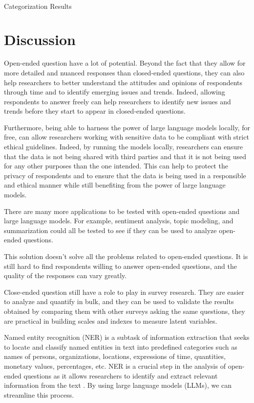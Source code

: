 \documentclass[
  authoryear,
  preprint,
  3p]{elsarticle}
\makeatletter
\let\oldparagraph\paragraph
\renewcommand{\paragraph}{
    \@ifstar
      \xxxParagraphStar
      \xxxParagraphNoStar
  }
\newcommand{\xxxParagraphStar}[1]{\oldparagraph*{#1}\mbox{}}
\newcommand{\xxxParagraphNoStar}[1]{\oldparagraph{#1}\mbox{}}
\makeatother
\begin{document}
\paragraph{Categorization Results}\label{categorization-results}

\section{Discussion}\label{discussion}

Open-ended question have a lot of potential. Beyond the fact that they
allow for more detailed and nuanced responses than closed-ended
questions, they can also help researchers to better understand the
attitudes and opinions of respondents through time and to identify
emerging issues and trends. Indeed, allowing respondents to answer
freely can help researchers to identify new issues and trends before
they start to appear in closed-ended questions.

Furthermore, being able to harness the power of large language models
locally, for free, can allow researchers working with sensitive data to
be compliant with strict ethical guidelines. Indeed, by running the
models locally, researchers can ensure that the data is not being shared
with third parties and that it is not being used for any other purposes
than the one intended. This can help to protect the privacy of
respondents and to ensure that the data is being used in a responsible
and ethical manner while still benefiting from the power of large
language models.

There are many more applications to be tested with open-ended questions
and large language models. For example, sentiment analysis, topic
modeling, and summarization could all be tested to see if they can be
used to analyze open-ended questions.

This solution doesn't solve all the problems related to open-ended
questions. It is still hard to find respondents willing to answer
open-ended questions, and the quality of the responses can vary greatly.

Close-ended question still have a role to play in survey research. They
are easier to analyze and quantify in bulk, and they can be used to
validate the results obtained by comparing them with other surveys
asking the same questions, they are practical in building scales and
indexes to measure latent variables.

Named entity recognition (NER) is a subtask of information extraction
that seeks to locate and classify named entities in text into predefined
categories such as names of persons, organizations, locations,
expressions of time, quantities, monetary values, percentages, etc. NER
is a crucial step in the analysis of open-ended questions as it allows
researchers to identify and extract relevant information from the text
\citep{yadav_bethard19}. By using large language models (LLMs), we can
streamline this process.
\end{document}
